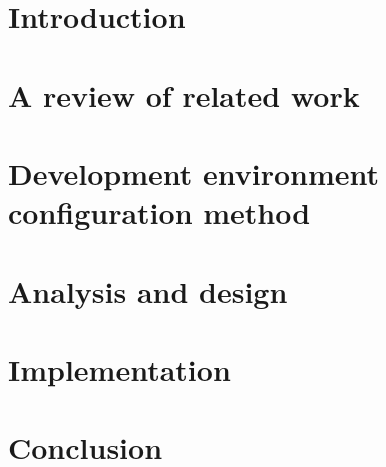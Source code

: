\documentclass[12pt,twoside]{report}
\begin{document}
\chapter{Introduction}


\chapter{A review of related work}


\chapter{Development environment configuration method}


\chapter{Analysis and design}


\chapter{Implementation}


\chapter{Conclusion}

\end{document}
